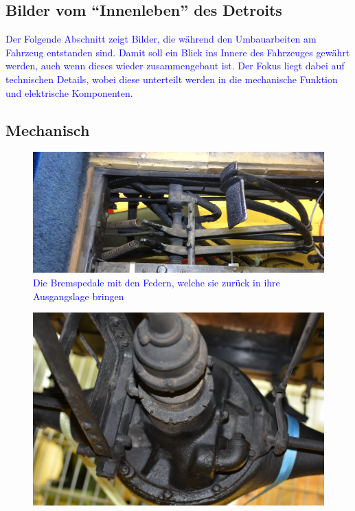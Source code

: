 \begin{landscape}\chapter{Bilder vom "`Innenleben"' des Detroits}

\textcolor{blue}{Der Folgende Abschnitt zeigt Bilder, die während den Umbauarbeiten am Fahrzeug entstanden sind. Damit soll ein Blick ins Innere des Fahrzeuges gewährt werden, auch wenn dieses wieder zusammengebaut ist. Der Fokus liegt dabei auf technischen Details, wobei diese unterteilt werden in die mechanische Funktion und elektrische Komponenten.}


\section{Mechanisch}
\begin{figure}[h]
	\centering
		\includegraphics[width=1.30\textwidth]{images/Anhang/Bremspedale.jpg}
	\caption{\textcolor{blue}{Die Bremspedale mit den Federn, welche sie zurück in ihre Ausgangslage bringen}}
	\label{fig:Bremspedale}
\end{figure}
\begin{figure}[h]
	\centering
		\includegraphics[width=1.30\textwidth]{images/Anhang/Differential.jpg}

\end{figure}
\end{landscape}
